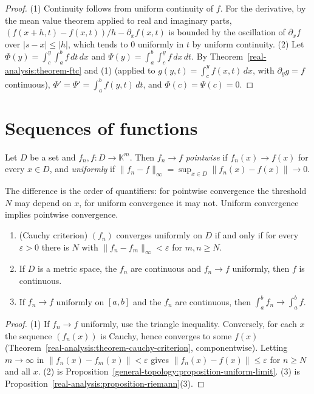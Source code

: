\begin{proof}
(1) Continuity follows from uniform continuity of $f$. For the derivative, by the mean value theorem applied to real and imaginary parts, $(f(x + h, t) - f(x, t))/h - \partial_xf(x, t)$ is bounded by the
oscillation of $\partial_xf$ over $|s - x| \leq |h|$, which tends to $0$ uniformly in $t$ by uniform continuity. (2) Let $\Phi(y) = \int_c^y\int_a^bf\,dt\,dx$ and $\Psi(y) = \int_a^b\int_c^yf\,dx\,dt$. By
Theorem~\ref{real-analysis:theorem-ftc} and (1) (applied to $g(y, t) = \int_c^yf(x, t)\,dx$, with $\partial_yg = f$ continuous), $\Phi' = \Psi' = \int_a^bf(y, t)\,dt$, and $\Phi(c) = \Psi(c) = 0$.
\end{proof}

\section{Sequences of functions}\label{real-analysis:section-function-sequences}

\begin{definition}\label{real-analysis:definition-uniform-convergence}
Let $D$ be a set and $f_n, f \colon D \to \mathbb{K}^m$. Then $f_n \to f$ \emph{pointwise} if $f_n(x) \to f(x)$ for every $x \in D$, and \emph{uniformly} if $\|f_n - f\|_\infty = \sup_{x \in D}\|f_n(x) - f(x)\| \to 0$.
\end{definition}

The difference is the order of quantifiers: for pointwise convergence the threshold $N$ may depend on $x$, for uniform convergence it may not. Uniform convergence implies pointwise convergence.

\begin{proposition}\label{real-analysis:proposition-uniform-cauchy}
\begin{enumerate}
\item (Cauchy criterion) $(f_n)$ converges uniformly on $D$ if and only if for every $\varepsilon > 0$ there is $N$ with $\|f_n - f_m\|_\infty < \varepsilon$ for $m, n \geq N$.
\item If $D$ is a metric space, the $f_n$ are continuous and $f_n \to f$ uniformly, then $f$ is continuous.
\item If $f_n \to f$ uniformly on $[a, b]$ and the $f_n$ are continuous, then $\int_a^bf_n \to \int_a^bf$.
\end{enumerate}
\end{proposition}

\begin{proof}
(1) If $f_n \to f$ uniformly, use the triangle inequality. Conversely, for each $x$ the sequence $(f_n(x))$ is Cauchy, hence converges to some $f(x)$ (Theorem~\ref{real-analysis:theorem-cauchy-criterion}, componentwise).
Letting $m \to \infty$ in $\|f_n(x) - f_m(x)\| < \varepsilon$ gives $\|f_n(x) - f(x)\| \leq \varepsilon$ for $n \geq N$ and all $x$. (2) is Proposition~\ref{general-topology:proposition-uniform-limit}. (3) is
Proposition~\ref{real-analysis:proposition-riemann}(3).
\end{proof}

